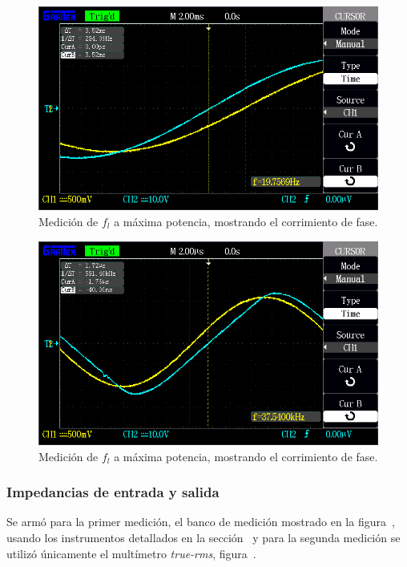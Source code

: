 \begin{figure}[H]
    \centering
    \includegraphics[width=0.95 \textwidth]{./img/mediciones/BW_power/3.png}
    \caption{Medición de $f_l$ a máxima potencia, mostrando el corrimiento de fase.}
    \label{fig:BW_power_fl_phase}
\end{figure}


\begin{figure}[H]
    \centering
    \includegraphics[width=0.95 \textwidth]{./img/mediciones/BW_power/4.png}
    \caption{Medición de $f_l$ a máxima potencia, mostrando el corrimiento de fase.}
    \label{fig:BW_power_fh_phase}
\end{figure}



\vfill
\clearpage


\subsubsection{Impedancias de entrada y salida}

Se armó para la primer medición, el banco de medición mostrado en la figura~, usando los instrumentos detallados en la sección~ y para la segunda medición se utilizó únicamente el multímetro \textit{true-rms}, figura~.


